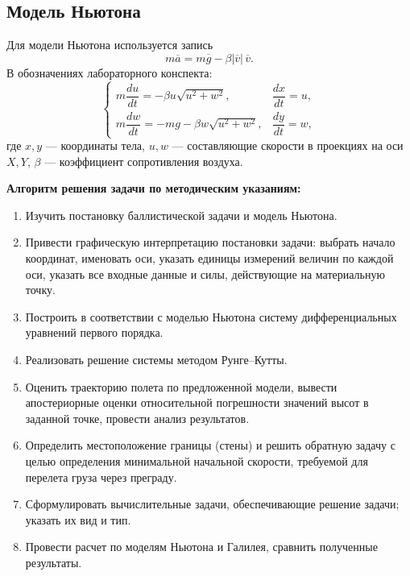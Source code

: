 \subsection*{Модель Ньютона}

Для модели Ньютона используется запись
\[
  m\overline{a}=m\overline{g}-\beta |\overline{v}|\,\overline{v}.
\]
В обозначениях лабораторного конспекта:
\[
\begin{cases}
  m\dfrac{du}{dt}=-\beta u\sqrt{u^2+w^2}, & \dfrac{dx}{dt}=u,\\
  m\dfrac{dw}{dt}=-mg-\beta w\sqrt{u^2+w^2}, & \dfrac{dy}{dt}=w,
\end{cases}
\]
где $x,y$ — координаты тела, $u,w$ — составляющие скорости в проекциях на оси $X,Y$, $\beta$ — коэффициент сопротивления воздуха.

\textbf{Алгоритм решения задачи по методическим указаниям:}
\begin{enumerate}
  \item Изучить постановку баллистической задачи и модель Ньютона.
  \item Привести графическую интерпретацию постановки задачи: выбрать начало
  координат, именовать оси, указать единицы измерений величин по каждой оси,
  указать все входные данные и силы, действующие на материальную точку.
  \item Построить в соответствии с моделью Ньютона систему дифференциальных
  уравнений первого порядка.
  \item Реализовать решение системы методом Рунге--Кутты.
  \item Оценить траекторию полета по предложенной модели, вывести
  апостериорные оценки относительной погрешности значений высот в заданной
  точке, провести анализ результатов.
  \item Определить местоположение границы (стены) и решить обратную задачу с
  целью определения минимальной начальной скорости, требуемой для перелета
  груза через преграду.
  \item Сформулировать вычислительные задачи, обеспечивающие решение задачи;
  указать их вид и тип.
  \item Провести расчет по моделям Ньютона и Галилея, сравнить полученные
  результаты.
\end{enumerate}

\clearpage
